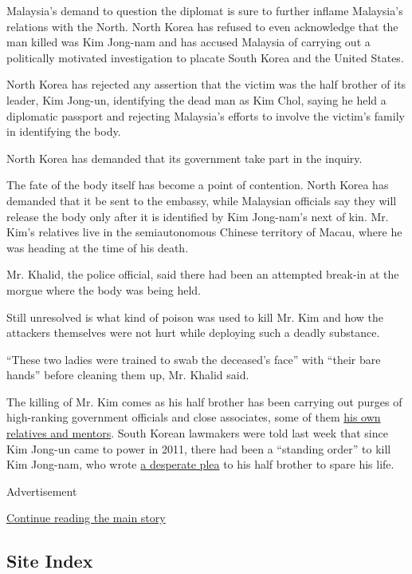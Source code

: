 Malaysia's demand to question the diplomat is sure to further inflame
Malaysia's relations with the North. North Korea has refused to even
acknowledge that the man killed was Kim Jong-nam and has accused
Malaysia of carrying out a politically motivated investigation to
placate South Korea and the United States.

North Korea has rejected any assertion that the victim was the half
brother of its leader, Kim Jong-un, identifying the dead man as Kim
Chol, saying he held a diplomatic passport and rejecting Malaysia's
efforts to involve the victim's family in identifying the body.

North Korea has demanded that its government take part in the inquiry.

The fate of the body itself has become a point of contention. North
Korea has demanded that it be sent to the embassy, while Malaysian
officials say they will release the body only after it is identified by
Kim Jong-nam's next of kin. Mr. Kim's relatives live in the
semiautonomous Chinese territory of Macau, where he was heading at the
time of his death.

Mr. Khalid, the police official, said there had been an attempted
break-in at the morgue where the body was being held.

Still unresolved is what kind of poison was used to kill Mr. Kim and how
the attackers themselves were not hurt while deploying such a deadly
substance.

``These two ladies were trained to swab the deceased's face'' with
``their bare hands'' before cleaning them up, Mr. Khalid said.

The killing of Mr. Kim comes as his half brother has been carrying out
purges of high-ranking government officials and close associates, some
of them
\href{https://www.nytimes.com/2017/02/15/world/asia/north-korea-executions-kim-jong-un.html}{his
own relatives and mentors}. South Korean lawmakers were told last week
that since Kim Jong-un came to power in 2011, there had been a
``standing order'' to kill Kim Jong-nam, who wrote
\href{https://www.nytimes.com/2017/02/15/world/asia/kim-jong-nam-assassination-north-korea.html}{a
desperate plea} to his half brother to spare his life.

Advertisement

\protect\hyperlink{after-bottom}{Continue reading the main story}

\hypertarget{site-index}{%
\subsection{Site Index}\label{site-index}}

